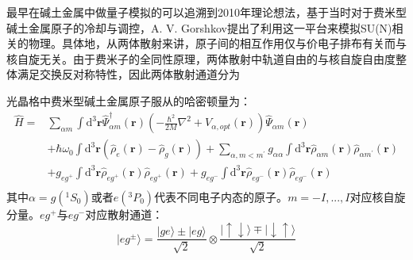 最早在碱土金属中做量子模拟的可以追溯到2010年理论想法，基于当时对于费米型碱土金属原子的冷却与调控，A. V. Gorshkov提出了利用这一平台来模拟SU(N)相关的物理。具体地，从两体散射来讲，原子间的相互作用仅与价电子排布有关而与核自旋无关。由于费米子的全同性原理，两体散射中轨道自由的与核自旋自由度整体满足交换反对称特性，因此两体散射通道分为

光晶格中费米型碱土金属原子服从的哈密顿量为：
\begin{equation}
\begin{aligned}
\hat{H}=& \sum_{\alpha m} \int \mathrm{d}^{3} \mathbf{r} \hat{\Psi}_{\alpha m}^{\dagger}(\mathbf{r})\left(-\frac{\hbar^{2}}{2 M} \nabla^{2}+V_{\alpha,opt}(\mathbf{r})\right) \hat{\Psi}_{\alpha m}(\mathbf{r}) \\
&+\hbar \omega_{0} \int \mathrm{d}^{3} \mathbf{r}\left(\hat{\rho}_{e}(\mathbf{r})-\hat{\rho}_{g}(\mathbf{r})\right)+ \sum_{\alpha, m<m^{\prime}} g_{\alpha \alpha} \int \mathrm{d}^{3} \mathbf{r} \hat{\rho}_{\alpha m}(\mathbf{r}) \hat{\rho}_{\alpha m^{\prime}}(\mathbf{r})  \\
&+ g_{e g^+} \int \mathrm{d}^{3} \mathbf{r} \hat{\rho}_{eg^+}(\mathbf{r}) \hat{\rho}_{eg^+}(\mathbf{r})+g_{e g^-} \int \mathrm{d}^{3} \mathbf{r} \hat{\rho}_{eg^-}(\mathbf{r}) \hat{\rho}_{eg^-}(\mathbf{r})\\
\end{aligned}
\end{equation}
其中$\alpha=g({^1S_0})$或者$e({}^3P_0)$代表不同电子内态的原子。$m=-I,...,I$对应核自旋分量。$eg^+$与$eg^-$对应散射通道：
\begin{equation}
|eg^{\pm}\rangle = \frac{|ge\rangle\pm|eg\rangle}{\sqrt{2}}\otimes\frac{|\uparrow\downarrow\rangle\mp|\downarrow\uparrow \rangle}{\sqrt{2}}
\end{equation}

